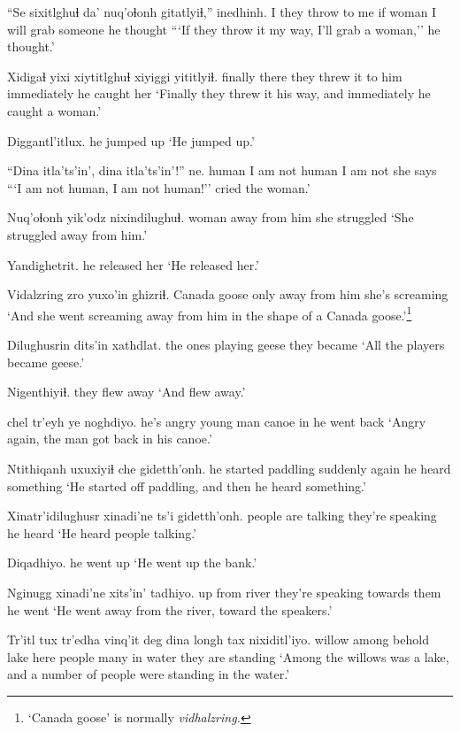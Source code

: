 \documentclass[12pt]{article}
\begin{document}
\gll ``Se sixitlghuɬ  da' nuq'oɬonh gitatlyiɬ,'' inedhinh.
I {they throw to me} if woman  {I will grab someone} {he thought}
\glt ```If they throw it my way, I'll grab a woman,'' he thought.'
\glend

\gll Xidigaɬ yixi {xiytitlghuɬ} xiyiggi yititlyiɬ.
finally there {they threw it to him} immediately {he caught her}
\glt `Finally they threw it his way, and immediately he caught a woman.'
\glend

\gll Diggantl'itlux.
{{he jumped up}}
\glt `He jumped up.'
\glend

\gll ``Dina itla'ts'in', dina  itla'ts'in'!'' ne.
human {I am not} human {I am not}  {she says}
\glt ```I am not human, I am not human!'' cried the woman.'
\glend

\gll Nuq'oɬonh yik'odz  nixindilughuɬ.
woman {away from him} {she struggled}
\glt `She struggled away from him.'
\glend

\gll Yandighetrit.
{{he released her}}
\glt `He released her.'
\glend

\gll Vidalzring  zro yuxo'in  ghizriɬ.
{Canada goose}  only {away from him} {she's screaming}
\glt `And she went screaming away from him in the shape of a Canada goose.'\footnote{`Canada goose' is normally \em vidhalzring.}
\glend

\gll Dilughusrin  dits'in xathdlat.
{the ones playing} geese {they became}
\glt `All the players became geese.'
\glend

\gll Nigenthiyiɬ.
{{they flew away}}
\glt `And flew away.'
\glend

 chel tr'eyh ye noghdiyo.
{he's angry} {young man} canoe in {he went back}
\glt `Angry again, the man got back in his canoe.'
\glend

\gll Ntithiqanh   uxuxiyiɬ che gidetth'onh.
{he started paddling} suddenly again {he heard something}
\glt `He started off paddling, and then he heard something.'
\glend

\gll Xinatr'idilughusr xinadi'ne ts'i gidetth'onh.
{people are talking}  {they're speaking}  {} {he heard}
\glt `He heard people talking.'
\glend

\gll Diqadhiyo.
{{he went up}}
\glt `He went up the bank.'
\glend

\gll Nginugg  xinadi'ne  xits'in' tadhiyo.
{up from river} {they're speaking}  {towards them}  {he went}
\glt `He went away from the river, toward the speakers.'
\glend

\gll Tr'itl tux  tr'edha vinq'it deg dina longh tax nixiditl'iyo.
willow among behold  lake  here  people many {in water} {they are standing} 
\glt `Among the willows was a lake, and a number of people were standing in the water.'
\glend
\end{document}
